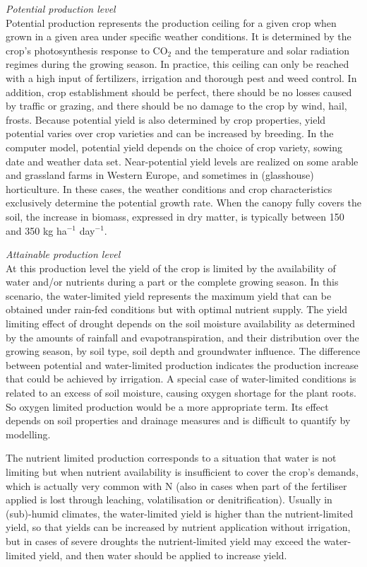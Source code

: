 {\it Potential production level\/}\\
Potential production represents the production ceiling for a given crop when grown in 
a given area under specific weather conditions. It is determined by the crop’s photosynthesis
response to CO$_{2}$ 
and the temperature and solar radiation regimes during the growing season. In practice, this 
ceiling can only be reached with a high input of fertilizers, irrigation and thorough pest and
weed control. In addition, crop establishment should be perfect, there should be no losses 
caused by traffic or grazing, and there should be no damage to the crop by wind, hail, frosts.
Because potential yield is also determined by crop properties, yield potential varies over
crop varieties and can be increased by breeding. In the computer model, potential yield 
depends on the choice of crop variety, sowing date and weather data set. Near-potential 
yield levels are realized on some arable and grassland farms in Western Europe, and 
sometimes in (glasshouse) horticulture. In these cases, the weather conditions and 
crop characteristics exclusively determine the potential growth rate. When the canopy 
fully covers the soil, the increase in biomass, expressed in dry matter, is typically 
between 150 and 350 kg ha$^{-1}$ day$^{-1}$.

{\it Attainable production level\/}\\
At this production level the yield of the crop is limited by the availability of water and/or nutrients 
during a part or the complete growing season.  
In this scenario, the water-limited yield represents the maximum yield that can be obtained under 
rain-fed conditions but with optimal nutrient supply. The yield limiting effect of drought depends on 
the soil moisture availability as determined by the amounts of rainfall and evapotranspiration, and 
their distribution over the growing season, by soil type, soil depth and groundwater influence. The 
difference between potential and water-limited production indicates the production increase that 
could be achieved by irrigation. A special case of water-limited conditions is related to an excess 
of soil moisture, causing oxygen shortage for the plant roots. So oxygen limited production would be 
a more appropriate term. Its effect depends on soil properties and drainage measures and is difficult 
to quantify by modelling.

The nutrient limited production corresponds to a situation that water is not limiting but when 
nutrient availability is insufficient to cover the crop's demands, which is actually very common with N 
(also in cases when part of the fertiliser applied is lost through leaching, volatilisation or denitrification).
Usually in (sub)-humid climates, the water-limited yield 
is higher than the nutrient-limited yield, so that yields can be increased by nutrient application without 
irrigation, but in cases of severe droughts the nutrient-limited yield may exceed the water-limited 
yield, and then water should be applied to increase yield.



